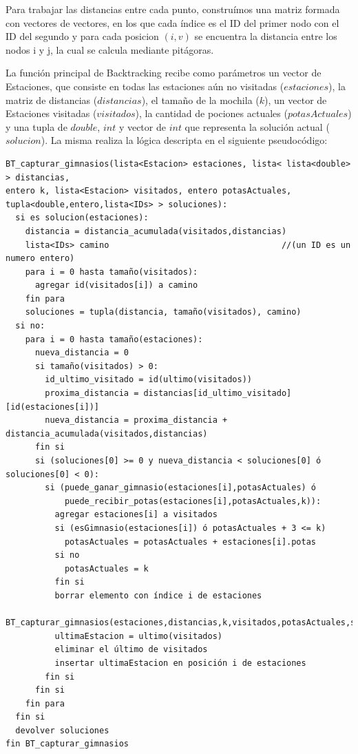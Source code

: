             Para trabajar las distancias entre cada punto, construímos una matriz formada con vectores de vectores, en los que cada índice es el ID del primer nodo con el ID del segundo y para cada posicion $(i,v)$ se encuentra la distancia entre los nodos i y j, la cual se calcula mediante pitágoras.

            La función principal de Backtracking recibe como parámetros un vector de Estaciones, que consiste en todas las estaciones aún no visitadas ($estaciones$), la matriz de distancias ($distancias$), el tamaño de la mochila ($k$), un vector de Estaciones visitadas ($visitados$), la cantidad de pociones actuales ($potasActuales$) y una tupla de $double$, $int$ y vector de $int$ que representa la solución actual ($solucion$). La misma realiza la lógica descripta en el siguiente pseudocódigo:

            \begin{codesnippet}
            \begin{verbatim}
BT_capturar_gimnasios(lista<Estacion> estaciones, lista< lista<double> > distancias,
entero k, lista<Estacion> visitados, entero potasActuales,
tupla<double,entero,lista<IDs> > soluciones):
  si es solucion(estaciones):
    distancia = distancia_acumulada(visitados,distancias)
    lista<IDs> camino                                   //(un ID es un numero entero)
    para i = 0 hasta tamaño(visitados):
      agregar id(visitados[i]) a camino
    fin para
    soluciones = tupla(distancia, tamaño(visitados), camino)
  si no:
    para i = 0 hasta tamaño(estaciones):
      nueva_distancia = 0
      si tamaño(visitados) > 0:
        id_ultimo_visitado = id(ultimo(visitados))
        proxima_distancia = distancias[id_ultimo_visitado][id(estaciones[i])]
        nueva_distancia = proxima_distancia + distancia_acumulada(visitados,distancias)
      fin si
      si (soluciones[0] >= 0 y nueva_distancia < soluciones[0] ó soluciones[0] < 0):
        si (puede_ganar_gimnasio(estaciones[i],potasActuales) ó
            puede_recibir_potas(estaciones[i],potasActuales,k)):
          agregar estaciones[i] a visitados
          si (esGimnasio(estaciones[i]) ó potasActuales + 3 <= k)
            potasActuales = potasActuales + estaciones[i].potas
          si no
            potasActuales = k
          fin si
          borrar elemento con índice i de estaciones
          BT_capturar_gimnasios(estaciones,distancias,k,visitados,potasActuales,soluciones)
          ultimaEstacion = ultimo(visitados)
          eliminar el último de visitados
          insertar ultimaEstacion en posición i de estaciones
        fin si
      fin si
    fin para
  fin si
  devolver soluciones
fin BT_capturar_gimnasios
            \end{verbatim}
            \end{codesnippet}

